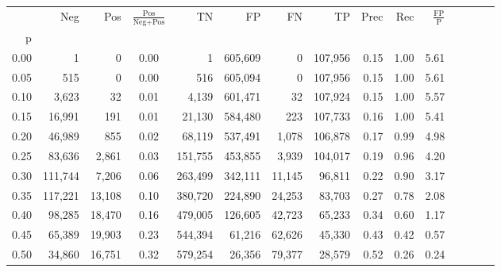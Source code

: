 \begin{tabular}{rrrcrrrrrrrrrrr}
\toprule
{} &      Neg &     Pos & $\frac{\text{Pos}}{\text{Neg}+\text{Pos}}$ &       TN &       FP &       FN &       TP &  Prec &   Rec & $\frac{\text{FP}}{\text{P}}$ \\
p    &          &         &                                            &          &          &          &          &       &       &                              \\
\midrule
0.00 &        1 &       0 &                                       0.00 &        1 &  605,609 &        0 &  107,956 &  0.15 &  1.00 &                         5.61 \\
0.05 &      515 &       0 &                                       0.00 &      516 &  605,094 &        0 &  107,956 &  0.15 &  1.00 &                         5.61 \\
0.10 &    3,623 &      32 &                                       0.01 &    4,139 &  601,471 &       32 &  107,924 &  0.15 &  1.00 &                         5.57 \\
0.15 &   16,991 &     191 &                                       0.01 &   21,130 &  584,480 &      223 &  107,733 &  0.16 &  1.00 &                         5.41 \\
0.20 &   46,989 &     855 &                                       0.02 &   68,119 &  537,491 &    1,078 &  106,878 &  0.17 &  0.99 &                         4.98 \\
0.25 &   83,636 &   2,861 &                                       0.03 &  151,755 &  453,855 &    3,939 &  104,017 &  0.19 &  0.96 &                         4.20 \\
0.30 &  111,744 &   7,206 &                                       0.06 &  263,499 &  342,111 &   11,145 &   96,811 &  0.22 &  0.90 &                         3.17 \\
0.35 &  117,221 &  13,108 &                                       0.10 &  380,720 &  224,890 &   24,253 &   83,703 &  0.27 &  0.78 &                         2.08 \\
0.40 &   98,285 &  18,470 &                                       0.16 &  479,005 &  126,605 &   42,723 &   65,233 &  0.34 &  0.60 &                         1.17 \\
0.45 &   65,389 &  19,903 &                                       0.23 &  544,394 &   61,216 &   62,626 &   45,330 &  0.43 &  0.42 &                         0.57 \\
0.50 &   34,860 &  16,751 &                                       0.32 &  579,254 &   26,356 &   79,377 &   28,579 &  0.52 &  0.26 &                         0.24 \\

\end{tabular}

